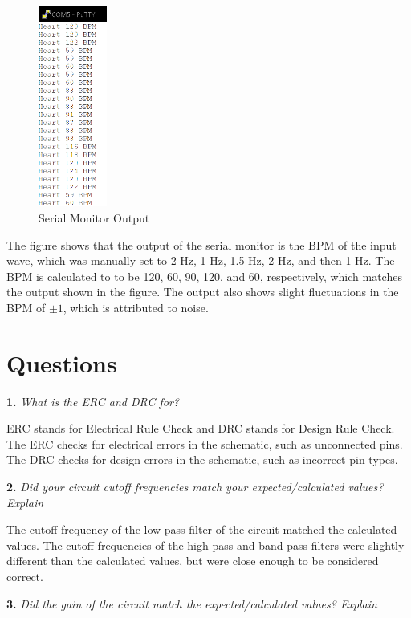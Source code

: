 \documentclass[CMPE]{KGCOEReport}
\begin{document}
\begin{figure}[H]
    \centering
    \includegraphics[width=0.2\textwidth]{putty.png}
    \caption{Serial Monitor Output}
    \label{fig:serialMonitor}
\end{figure}

The figure shows that the output of the serial monitor is the BPM of the input wave, which was manually set to 2 Hz, 1 Hz, 1.5 Hz, 2 Hz, and then 1 Hz. The BPM is calculated to to be 120, 60, 90, 120, and 60, respectively, which matches the output shown in the figure. The output also shows slight fluctuations in the BPM of $\pm 1$, which is attributed to noise.

\section*{Questions}

\textbf{1.} \emph{What is the ERC and DRC for?}

ERC stands for Electrical Rule Check and DRC stands for Design Rule Check. The ERC checks for electrical errors in the schematic, such as unconnected pins. The DRC checks for design errors in the schematic, such as incorrect pin types.

\bigskip

\textbf{2.} \emph{Did your circuit cutoff frequencies match your expected/calculated values? Explain}

The cutoff frequency of the low-pass filter of the circuit matched the calculated values. The cutoff frequencies of the high-pass and band-pass filters were slightly different than the calculated values, but were close enough to be considered correct.

\bigskip

\textbf{3.} \emph{Did the gain of the circuit match the expected/calculated values? Explain}
\end{document}
